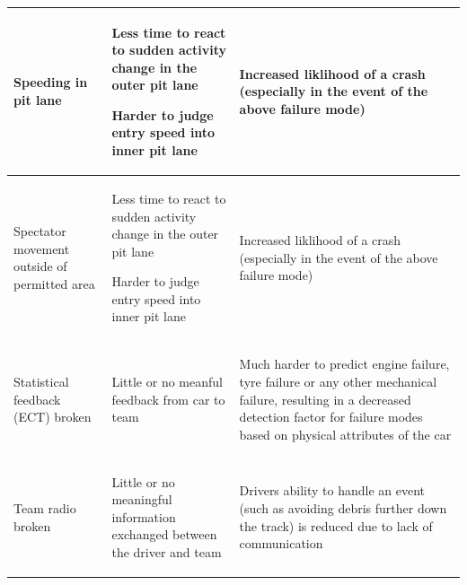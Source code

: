 \documentclass[12pt]{article} %
\begin{document}
\begin{center}
\begin{longtable}{p{4cm} | p{6cm}| p{6cm}}
		Speeding in pit lane & %
			\begin{description} \item{Less time to react to sudden activity change in the outer pit lane} \item{Harder to judge entry speed into inner pit lane}
			\end{description} & 
			\begin{description} \item{Increased liklihood of a crash (especially in the event of the above failure mode)}
			\end{description}\\ \hline


		Spectator movement outside of permitted area &
			\begin{description} \item{Less time to react to sudden activity change in the outer pit lane} \item{Harder to judge entry speed into inner pit lane}
			\end{description} & 
			\begin{description} \item{Increased liklihood of a crash (especially in the event of the above failure mode)}
			\end{description}\\ \hline


		Statistical feedback (ECT) broken &
			\begin{description} \item{Little or no meanful feedback from car to team}
			\end{description} & 
			\begin{description} \item{Much harder to predict engine failure, tyre failure or any other mechanical failure, resulting in a decreased detection factor for failure modes based on physical attributes of the car}
			\end{description}\\ \hline


		Team radio broken &
			\begin{description} \item{Little or no meaningful information exchanged between the driver and team}
			\end{description} & 
			\begin{description} \item{Drivers ability to handle an event (such as avoiding debris further down the track) is reduced due to lack of communication}
			\end{description}\\ \hline



\end{longtable}
\end{center}
\end{document}
